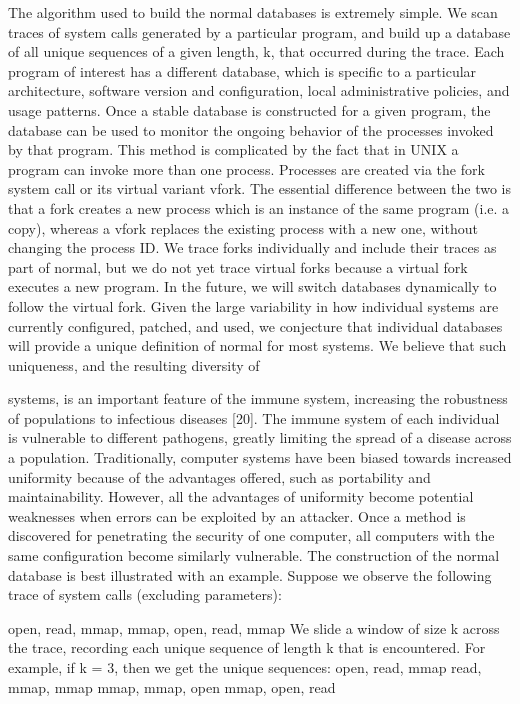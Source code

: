 \documentclass{report}
\begin{document}
\begin{spacing}{1.5}
The algorithm used to build the normal databases is extremely simple. We scan traces of
system calls generated by a particular program, and build up a database of all unique
sequences of a given length, k, that occurred during the trace. Each program of interest
has a different database, which is specific to a particular architecture, software version
and configuration, local administrative policies, and usage patterns. Once a stable
database is constructed for a given program, the database can be used to monitor the
ongoing behavior of the processes invoked by that program.
This method is complicated by the fact that in UNIX a program can invoke more than one
process. Processes are created via the fork system call or its virtual variant vfork. The
essential difference between the two is that a fork creates a new process which is an
instance of the same program (i.e. a copy), whereas a vfork replaces the existing
process with a new one, without changing the process ID. We trace forks individually and
include their traces as part of normal, but we do not yet trace virtual forks because a
virtual fork executes a new program. In the future, we will switch databases dynamically
to follow the virtual fork.
Given the large variability in how individual systems are currently configured, patched,
and used, we conjecture that individual databases will provide a unique definition of
normal for most systems. We believe that such uniqueness, and the resulting diversity of


systems, is an important feature of the immune system, increasing the robustness of
populations to infectious diseases [20]. The immune system of each individual is
vulnerable to different pathogens, greatly limiting the spread of a disease across a
population. Traditionally, computer systems have been biased towards increased
uniformity because of the advantages offered, such as portability and maintainability.
However, all the advantages of uniformity become potential weaknesses when errors can
be exploited by an attacker. Once a method is discovered for penetrating the security of
one computer, all computers with the same configuration become similarly vulnerable.
The construction of the normal database is best illustrated with an example. Suppose we
observe the following trace of system calls (excluding parameters):


open, read, mmap, mmap, open, read, mmap
We slide a window of size k across the trace, recording each unique sequence of length k
that is encountered. For example, if k = 3, then we get the unique sequences:
open, read, mmap
read, mmap, mmap
mmap, mmap, open
mmap, open, read



\end{spacing}
\end{document}

